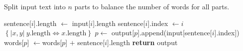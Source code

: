 \documentclass{pbml}
\begin{document}
% 

%



\begin{algorithm}
\caption{Split input text into $n$ parts to balance the number of words for all parts.}
\begin{algorithmic}
\State sentence[$i$].length $\gets$ input[$i$].length
\State sentence[$i$].index $\gets i$
\EndFor
\State {} $\left\{|x,y|\ y.\mbox{length}\Leftrightarrow x.\mbox{length}\right\}$ 
\State {}
\State $p \gets$ 
\State {}
\State output[$p$].append(input[sentence[$i$].index])
\State words[$p$] $\gets$\hspace{0em}words[$p$] $+$ sentence[$i$].length%
\EndFor
\State \textbf{return} output
\EndFunction
\end{algorithmic}
\label{alg:words}
\end{algorithm}
%
%
\end{document}

